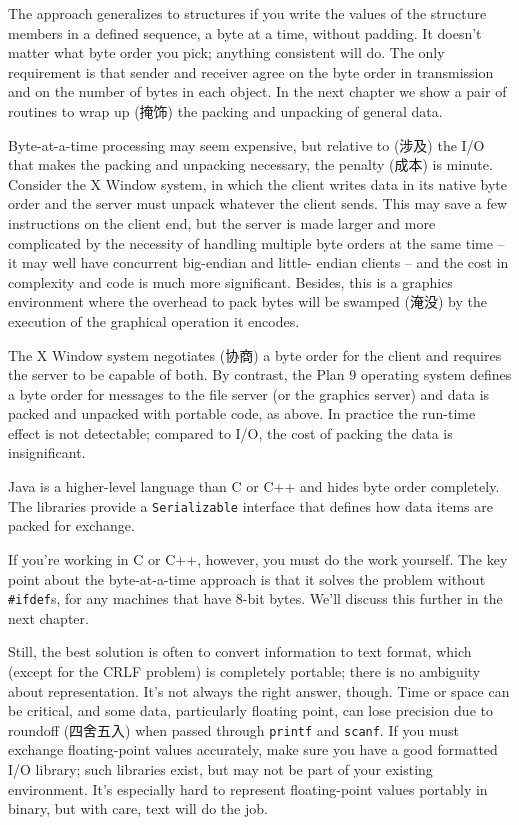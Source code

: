 The approach generalizes to structures if you write the values of the
structure members in a defined sequence, a byte at a time, without padding.
It doesn't matter what byte order you pick; anything consistent will do.
The only requirement is that sender and receiver agree on the byte order in
transmission and on the number of bytes in each object. In the next chapter
we show a pair of routines to wrap up (掩饰) the packing and unpacking of
general data.

Byte-at-a-time processing may seem expensive, but relative to (涉及) the
I/O that makes the packing and unpacking necessary, the penalty (成本) is
minute. Consider the X Window system, in which the client writes data in
its native byte order and the server must unpack whatever the client sends.
This may save a few instructions on the client end, but the server is made
larger and more complicated by the necessity of handling multiple byte
orders at the same time -- it may well have concurrent big-endian and
little- endian clients -- and the cost in complexity and code is much more
significant.  Besides, this is a graphics environment where the overhead to
pack bytes will be swamped (淹没) by the execution of the graphical
operation it encodes.

The X Window system negotiates (协商) a byte order for the client and
requires the server to be capable of both. By contrast, the Plan 9
operating system defines a byte order for messages to the file server (or
the graphics server) and data is packed and unpacked with portable code, as
above. In practice the run-time effect is not detectable; compared to I/O,
the cost of packing the data is insignificant.

Java is a higher-level language than C or C++ and hides byte order
completely.  The libraries provide a \verb'Serializable' interface that
defines how data items are packed for exchange.

If you're working in C or C++, however, you must do the work yourself. The
key point about the byte-at-a-time approach is that it solves the problem
without \verb'#ifdef's, for any machines that have 8-bit bytes. We'll
discuss this further in the next chapter.

Still, the best solution is often to convert information to text format,
which (except for the CRLF problem) is completely portable; there is no
ambiguity about representation. It's not always the right answer, though.
Time or space can be critical, and some data, particularly floating point,
can lose precision due to roundoff (四舍五入) when passed through
\verb'printf' and \verb'scanf'. If you must exchange floating-point values
accurately, make sure you have a good formatted I/O library; such libraries
exist, but may not be part of your existing environment. It's especially
hard to represent floating-point values portably in binary, but with care,
text will do the job.

